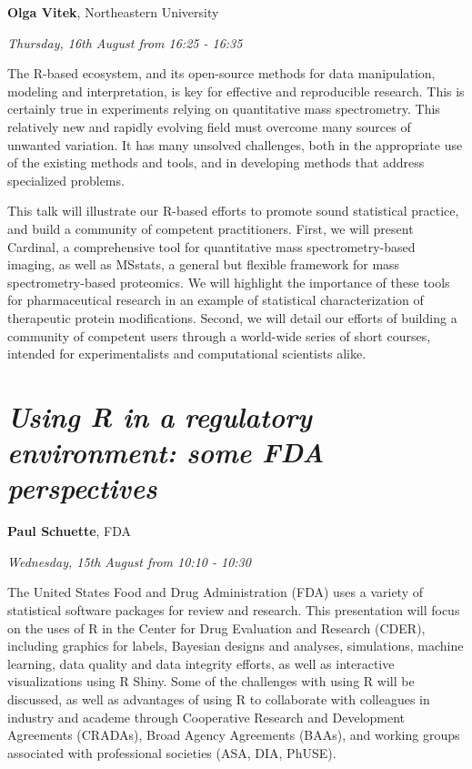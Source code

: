 \documentclass[]{book}
\theoremstyle{definition}
\theoremstyle{definition}
\theoremstyle{definition}
\theoremstyle{remark}
\begin{document}
\textbf{Olga Vitek}, Northeastern University

\emph{Thursday, 16th August from 16:25 - 16:35}

The R-based ecosystem, and its open-source methods for data
manipulation, modeling and interpretation, is key for effective and
reproducible research. This is certainly true in experiments relying on
quantitative mass spectrometry. This relatively new and rapidly evolving
field must overcome many sources of unwanted variation. It has many
unsolved challenges, both in the appropriate use of the existing methods
and tools, and in developing methods that address specialized problems.

This talk will illustrate our R-based efforts to promote sound
statistical practice, and build a community of competent practitioners.
First, we will present Cardinal, a comprehensive tool for quantitative
mass spectrometry-based imaging, as well as MSstats, a general but
flexible framework for mass spectrometry-based proteomics. We will
highlight the importance of these tools for pharmaceutical research in
an example of statistical characterization of therapeutic protein
modifications. Second, we will detail our efforts of building a
community of competent users through a world-wide series of short
courses, intended for experimentalists and computational scientists
alike.

\hypertarget{using-r-in-a-regulatory-environment-some-fda-perspectives}{%
\section{\texorpdfstring{\emph{Using R in a regulatory environment: some
FDA
perspectives}}{Using R in a regulatory environment: some FDA perspectives}}\label{using-r-in-a-regulatory-environment-some-fda-perspectives}}

\textbf{Paul Schuette}, FDA

\emph{Wednesday, 15th August from 10:10 - 10:30}

The United States Food and Drug Administration (FDA) uses a variety of
statistical software packages for review and research. This presentation
will focus on the uses of R in the Center for Drug Evaluation and
Research (CDER), including graphics for labels, Bayesian designs and
analyses, simulations, machine learning, data quality and data integrity
efforts, as well as interactive visualizations using R Shiny. Some of
the challenges with using R will be discussed, as well as advantages of
using R to collaborate with colleagues in industry and academe through
Cooperative Research and Development Agreements (CRADAs), Broad Agency
Agreements (BAAs), and working groups associated with professional
societies (ASA, DIA, PhUSE).
\end{document}
